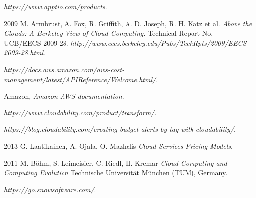 \documentclass[licencjacka,en]{thesisclass}
\begin{document}
\begin{thebibliography}{99}

    \textit{https://www.apptio.com/products}.

    2009 M. Armbrust, A. Fox, R. Griffith, A. D. Joseph, R. H. Katz et al.
    \textit{Above the Clouds: A Berkeley View of Cloud Computing.}
    Technical Report No. UCB/EECS-2009-28.
    \textit{http://www.eecs.berkeley.edu/Pubs/TechRpts/2009/EECS-2009-28.html}.

    \textit{https://docs.aws.amazon.com/aws-cost-management/latest/APIReference/Welcome.html/}.

    Amazon,
    \textit{Amazon AWS documentation}.

    \textit{https://www.cloudability.com/product/transform/}.

    \textit{https://blog.cloudability.com/creating-budget-alerts-by-tag-with-cloudability/}.

    2013 G. Laatikainen, A. Ojala, O. Mazhelis
    \textit{Cloud Services Pricing Models}.

    2011 M. Böhm, S. Leimeisier, C. Riedl, H. Krcmar
    \textit{Cloud Computing and Computing Evolution}
    Technische Universität München (TUM), Germany.

    \textit{https://go.snowsoftware.com/}.

\end{thebibliography}
\end{document}
